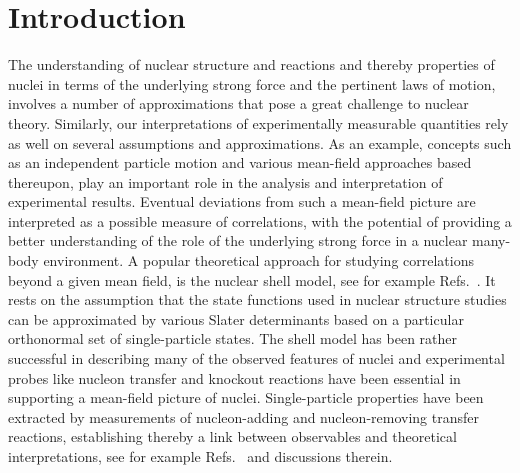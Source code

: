 \documentclass[aps,showpacs,floatfix,nofootinbib,preprintnumbers,superscriptaddress,amsmath,amssymb]{revtex4-1}
\begin{document}

\maketitle 


\section{Introduction}\label{sec:intro}

The understanding of nuclear structure and reactions and thereby
properties of nuclei in terms of the underlying strong force and the
pertinent laws of motion, involves a number of approximations that
pose a great challenge to nuclear theory.  Similarly, our interpretations of
experimentally measurable quantities rely as well on several assumptions and
approximations.  As an example, concepts such as an independent
particle motion and various mean-field approaches based thereupon,
play an important role in the analysis and interpretation of
experimental results. Eventual deviations from such a mean-field
picture are interpreted as a possible measure of correlations, with
the potential of providing a better understanding of the role of the
underlying strong force in a nuclear many-body environment.  A popular
theoretical approach for studying correlations beyond a given mean field, is
the nuclear shell model, see for example
Refs.~\cite{lawson1980,talmi1993,caurier2005}. It rests on the assumption that the
state functions used in nuclear structure studies can be approximated
by various Slater determinants based on a particular orthonormal set of
single-particle states. The shell model has been rather successful in
describing many of the observed features of nuclei and experimental
probes like nucleon transfer and knockout reactions have been
essential in supporting a mean-field picture of
nuclei. Single-particle properties have been extracted by measurements
of nucleon-adding and nucleon-removing transfer reactions,
establishing thereby a link between observables and theoretical
interpretations, see for example
Refs.~\cite{schiffer2012,schiffer2013} and discussions therein. 
\end{document}
